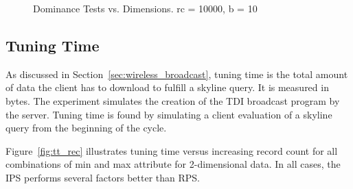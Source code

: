 \begin{figure}[!h]
  \centering
  \caption{\small Dominance Tests vs. Dimensions. rc = 10000, b = 10}
  \label{fig:dt_dim}
\end{figure}


\subsection{Tuning Time}\label{sec:exp_tuning_time}

As discussed in Section~\ref{sec:wireless_broadcast}, tuning time is the total amount of data the client has to download to fulfill a skyline query. It is measured in bytes. The experiment simulates the creation of the TDI broadcast program by the server. Tuning time is found by simulating a client evaluation of a skyline query from the beginning of the cycle.

Figure~\ref{fig:tt_rec} illustrates tuning time versus increasing record count for all combinations of min and max attribute for 2-dimensional data. In all cases, the IPS performs several factors better than RPS.

